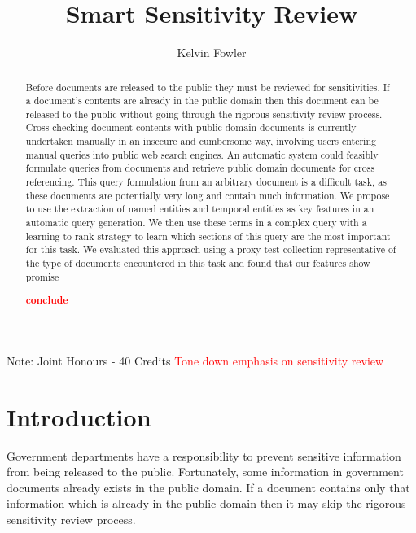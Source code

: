 \documentclass{mpaper}
\newcommand{\remove}[1]{\textcolor{red}{#1}}
\begin{document}
\title{Smart Sensitivity Review}
\author{Kelvin Fowler}

\maketitle
\small{Note: Joint Honours - 40 Credits}
\remove{Tone down emphasis on sensitivity review}
\begin{abstract}
Before documents are released to the public they must be reviewed for sensitivities. If a document's contents are already in the public domain then this document can be released to the public without going through the rigorous sensitivity review process.
Cross checking document contents with public domain documents is currently undertaken manually in an insecure and cumbersome way, involving users entering manual queries into public web search engines.
An automatic system could feasibly formulate queries from documents and retrieve public domain documents for cross referencing.
This query formulation from an arbitrary document is a difficult task, as these documents are potentially very long and contain much information.
We propose to use the extraction of named entities and temporal entities as key features in an automatic query generation.
We then use these terms in a complex query with a learning to rank strategy to learn which sections of this query are the most important for this task.
We evaluated this approach using a proxy test collection representative of the type of documents encountered in this task and found that our features show promise 

\remove{\textbf{conclude}}
\end{abstract}

\section{Introduction} \label{sec:intro}
Government departments have a responsibility to prevent sensitive information from being released to the public. Fortunately, some information in government documents already exists in the public domain. If a document contains only that information which is already in the public domain then it may skip the rigorous sensitivity review process.
\end{document}
